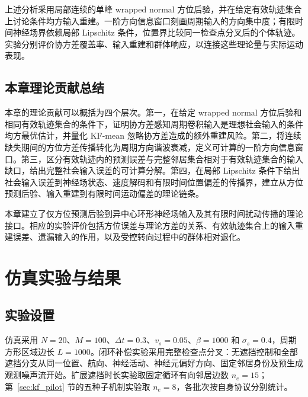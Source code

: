 \documentclass[UTF8,fontset=windows,11pt]{ctexart}
\begin{document}
上述分析采用局部连续的单峰 wrapped normal 方位后验，并在给定有效轨迹集合上讨论条件均方输入重建。一阶方向信息窗口刻画周期输入的方向集中度；有限时间神经场界依赖局部 Lipschitz 条件，位置界比较同一检查点分叉后的个体轨迹。实验分别评价协方差覆盖率、输入重建和群体响应，以连接这些理论量与实际运动表现。

\subsection{本章理论贡献总结}

本章的理论贡献可以概括为四个层次。第一，在给定 wrapped normal 方位后验和相同有效轨迹集合的条件下，证明协方差感知周期卷积输入是理想社会输入的条件均方最优估计，并量化 KF-mean 忽略协方差造成的额外重建风险。第二，将连续缺失期间的方位方差传播转化为周期方向谐波衰减，定义可计算的一阶方向信息窗口。第三，区分有效轨迹内的预测误差与完整邻居集合相对于有效轨迹集合的输入缺口，给出完整社会输入误差的可计算分解。第四，在局部 Lipschitz 条件下给出社会输入误差到神经场状态、速度解码和有限时间位置偏差的传播界，建立从方位预测后验、输入重建到有限时间运动偏差的理论链条。

本章建立了仅方位预测后验到异中心环形神经场输入及其有限时间扰动传播的理论接口。相应的实验评价包括方位误差与理论方差的关系、有效轨迹集合上的输入重建误差、遗漏输入的作用，以及受控转向过程中的群体相对退化。

\section{仿真实验与结果}

\subsection{实验设置}

仿真采用 $N=20$、$M=100$、$\Delta t=0.3$、$v_s=0.05$、$\beta=1000$ 和 $\sigma_s=0.4$，周期方形区域边长 $L=1000$。闭环补偿实验采用完整检查点分叉：无遮挡控制和全部遮挡分支从同一位置、航向、神经活动、神经元偏好方向、固定邻居身份及预生成观测噪声流开始。扩展遮挡时长实验取固定循环有向邻居边数 $n_e=15$；第~\ref{sec:kf_pilot} 节的五种子机制实验取 $n_e=8$，各批次按自身协议分别统计。
\end{document}
